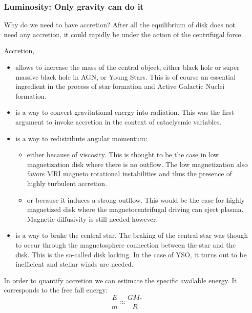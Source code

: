 \documentclass[10pt,a4paper,english]{article}
\begin{document}
\subsubsection{Luminosity: Only gravity can do it}

Why do we need to have accretion? After all the equilibrium of disk does not
need any accretion, it could rapidly be under the action of the centrifugal
force.

Accretion,
\begin{itemize}
    \item allows to increase the mass of the central object, either black hole
          or super massive black hole in AGN, or Young Stars. This is of course
          an essential ingredient in the process of star formation and Active
          Galactic Nuclei formation.
    \item is a way to convert gravitational energy into radiation. This was the
          first argument to invoke accretion in the context of cataclysmic
          variables.
    \item is a way to redistribute angular momentum:
          \begin{itemize}
              \item either because of viscosity. This is thought to be the case
                    in low magnetization disk where there is no outflow. The
                    low magnetization also favors MRI magneto rotational
                    instabilities and thus the presence of highly turbulent
                    accretion.
              \item or because it induces a strong outflow. This would be the
                    case for highly magnetized disk where the
                    magnetocentrifugal driving can eject plasma. Magnetic
                    diffusivity is still needed however.
          \end{itemize}
    \item is a way to brake the central star. The braking of the central star
          was though to occur through the magnetosphere connection between the
          star and the disk. This is the so-called disk locking. In the case of
          YSO, it turns out to be inefficient and stellar winds are needed.
\end{itemize}

In order to quantify accretion we can estimate the specific available energy.
It corresponds to the free fall energy:
\begin{equation*}
    \frac{E}{m} \approx \frac{GM_*}{R}
\end{equation*}
\end{document}
